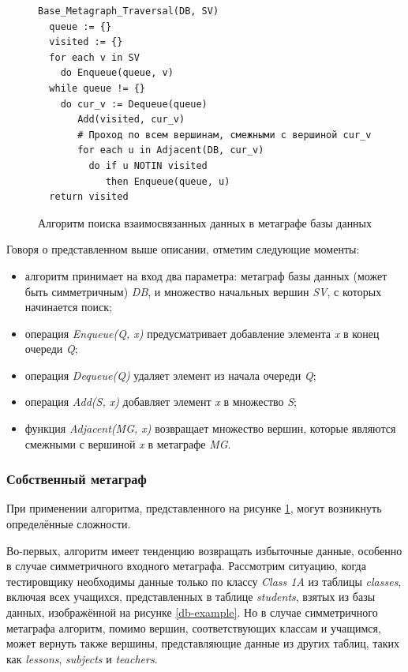 \begin{figure}
  \begin{lstlisting}
Base_Metagraph_Traversal(DB, SV)
  queue := {}
  visited := {}
  for each v in SV
    do Enqueue(queue, v)
  while queue != {}
    do cur_v := Dequeue(queue)
       Add(visited, cur_v)
       # Проход по всем вершинам, смежными с вершиной cur_v
       for each u in Adjacent(DB, cur_v)
         do if u NOTIN visited
            then Enqueue(queue, u)
  return visited
  \end{lstlisting}
  \caption{Алгоритм поиска взаимосвязанных данных в метаграфе базы данных}
  \label{base-algorithm}
\end{figure}

Говоря о представленном выше описании, отметим следующие моменты:
\begin{itemize}
  \item алгоритм принимает на вход два параметра: метаграф базы данных (может быть симметричным) \textit{DB}, и множество начальных вершин \textit{SV}, с которых начинается поиск;
  \item операция \textit{Enqueue(Q, x)} предусматривает добавление элемента \textit{x} в конец очереди \textit{Q};
  \item операция \textit{Dequeue(Q)} удаляет элемент из начала очереди \textit{Q};
  \item операция \textit{Add(S, x)} добавляет элемент \textit{x} в множество \textit{S};
  \item функция \textit{Adjacent(MG, x)} возвращает множество вершин, которые являются смежными с вершиной \textit{x} в метаграфе \textit{MG}.
\end{itemize}

\subsubsection{Собственный метаграф}

При применении алгоритма, представленного на рисунке \ref{base-algorithm}, могут возникнуть определённые сложности.

Во-первых, алгоритм имеет тенденцию возвращать избыточные данные, особенно в случае симметричного входного метаграфа. Рассмотрим ситуацию, когда тестировщику необходимы данные только по классу \textit{Class 1A} из таблицы \textit{classes}, включая всех учащихся, представленных в таблице \textit{students}, взятых из базы данных, изображённой на рисунке \ref{db-example}. Но в случае симметричного метаграфа алгоритм, помимо вершин, соответствующих классам и учащимся, может вернуть также вершины, представляющие данные из других таблиц, таких как \textit{lessons}, \textit{subjects} и \textit{teachers}.

